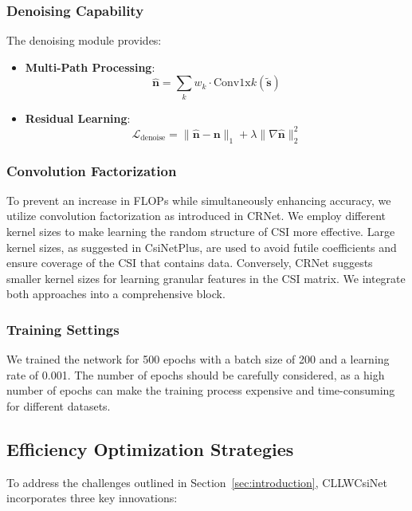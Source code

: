 \documentclass[lettersize,journal]{IEEEtran}
\begin{document}
\subsubsection{Denoising Capability} 
\label{subsubsec:denoising}

The denoising module provides:

\begin{itemize}
    \item \textbf{Multi-Path Processing}:
    \begin{equation}
        \hat{\mathbf{n}} = \sum_{k} w_k \cdot \text{Conv1x}k(\tilde{\mathbf{s}})
    \end{equation}

    \item \textbf{Residual Learning}:
    \begin{equation}
        \mathcal{L}_{\text{denoise}} = \|\hat{\mathbf{n}} - \mathbf{n}\|_1 + \lambda\|\nabla\hat{\mathbf{n}}\|_2^2
    \end{equation}
\end{itemize}

\subsubsection{Convolution Factorization} To prevent an increase in FLOPs while simultaneously enhancing accuracy, we utilize convolution factorization as introduced in CRNet\cite{abn}. We employ different kernel sizes to make learning the random structure of CSI more effective. Large kernel sizes, as suggested in CsiNetPlus\cite{abo}, are used to avoid futile coefficients and ensure coverage of the CSI that contains data. Conversely, CRNet\cite{abn} suggests smaller kernel sizes for learning granular features in the CSI matrix. We integrate both approaches into a comprehensive block.

\subsubsection{Training Settings}
We trained the network for 500 epochs with a batch size of 200 and a learning rate of 0.001. The number of epochs should be carefully considered, as a high number of epochs can make the training process expensive and time-consuming for different datasets.

\subsection{Efficiency Optimization Strategies} \label{subsec:efficiency}
To address the challenges outlined in Section~\ref{sec:introduction}, CLLWCsiNet incorporates three key innovations:
\end{document}
